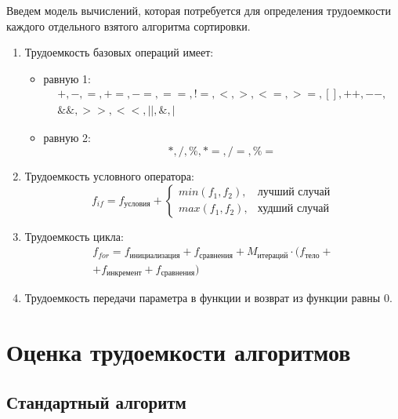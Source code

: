 Введем модель вычислений, которая потребуется для определения 
трудоемкости каждого отдельного взятого алгоритма сортировки.
\begin{enumerate}[label={\arabic*)}]
	\item Трудоемкость базовых операций имеет:
	\begin{itemize}[label=---]
		\item равную 1:
		\begin{equation}
			\label{for:operations_1}
			\begin{gathered}
				+, -, =, +=, -=, ==, !=, <, >, <=, >=, [], ++, {-}-,\\
				\&\&, >>, <<, ||, \&, |
			\end{gathered}
		\end{equation}
		\item равную 2:
		\begin{equation}
			\label{for:operations_2}
			*, /, \%, *=, /=, \%=
		\end{equation}
	\end{itemize}
	\item Трудоемкость условного оператора:
	\begin{equation}
		\label{for:if}
		f_{if} = f_{\text{условия}} + 
		\begin{cases}
			min(f_1, f_2), & \text{лучший случай}\\
			max(f_1, f_2), & \text{худший случай}
		\end{cases}
	\end{equation}
	\item Трудоемкость цикла:
	\begin{equation}
		\label{for:for}
		\begin{gathered}
			f_{for} = f_{\text{инициализация}} + f_{\text{сравнения}} + M_{\text{итераций}} \cdot (f_{\text{тело}} +\\
			+ f_{\text{инкремент}} + f_{\text{сравнения}})
		\end{gathered}
	\end{equation}
	\item Трудоемкость передачи параметра в функции и возврат из функции равны 0.
\end{enumerate}

\clearpage

\section{Оценка трудоемкости алгоритмов}

\subsection{Стандартный алгоритм}

